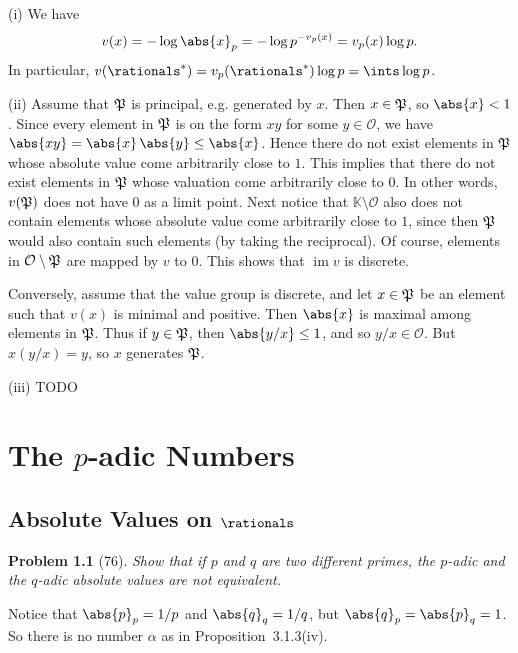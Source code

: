 \documentclass[a4paper, 11pt]{memoir}
\theoremstyle{plaincustomnumber}
\newtheorem{problem}{Problem}
\theoremstyle{changedotbreakcustomnumber}
\newcommand{\calO}{\mathcal{O}}
\newcommand{\fieldK}{\mathbb{K}}
\newcommand{\im}{\operatorname{im}}
\begin{document}
\begin{solution}
    (i) We have
    \begin{equation*}
        v(x)
            = -\log \abs{x}_p
            = -\log p^{-v_p(x)}
            = v_p(x) \log p.
    \end{equation*}
    In particular, $v(\rationals^*) = v_p(\rationals^*) \log p = \ints \log p$.

    (ii) Assume that $\mathfrak{P}$ is principal, e.g. generated by $x$. Then $x \in \mathfrak{P}$, so $\abs{x} < 1$. Since every element in $\mathfrak{P}$ is on the form $xy$ for some $y \in \calO$, we have $\abs{xy} = \abs{x} \, \abs{y} \leq \abs{x}$. Hence there do not exist elements in $\mathfrak{P}$ whose absolute value come arbitrarily close to $1$. This implies that there do not exist elements in $\mathfrak{P}$ whose valuation come arbitrarily close to $0$. In other words, $v(\mathfrak{P})$ does not have $0$ as a limit point. Next notice that $\fieldK \setminus \calO$ also does not contain elements whose absolute value come arbitrarily close to $1$, since then $\mathfrak{P}$ would also contain such elements (by taking the reciprocal). Of course, elements in $\calO \setminus \frakP$ are mapped by $v$ to $0$. This shows that $\im v$ is discrete.

    Conversely, assume that the value group is discrete, and let $x \in \mathfrak{P}$ be an element such that $v(x)$ is minimal and positive. Then $\abs{x}$ is maximal among elements in $\mathfrak{P}$. Thus if $y \in \mathfrak{P}$, then $\abs{y/x} \leq 1$, and so $y/x \in \calO$. But $x(y/x) = y$, so $x$ generates $\mathfrak{P}$.

    (iii) TODO
\end{solution}


\chapter{The $p$-adic Numbers}

\section{Absolute Values on $\rationals$}

\begin{problem}[76]
    Show that if $p$ and $q$ are two different primes, the $p$-adic and the $q$-adic absolute values are not equivalent.
\end{problem}

\begin{solution}
    Notice that $\abs{p}_p = 1/p$ and $\abs{q}_q = 1/q$, but $\abs{q}_p = \abs{p}_q = 1$. So there is no number $\alpha$ as in Proposition~3.1.3(iv).
\end{solution}
\end{document}
